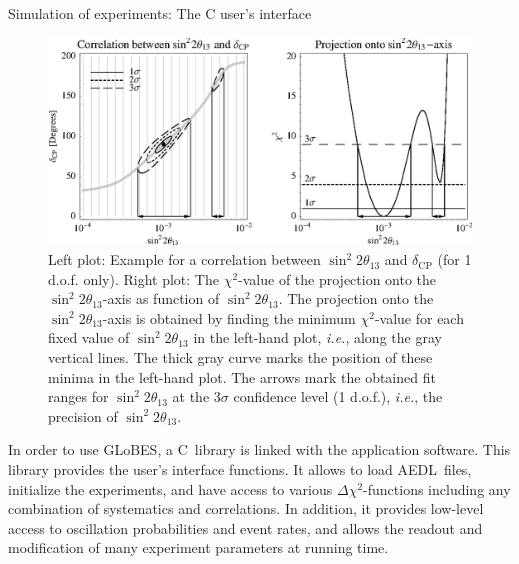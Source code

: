 \documentclass[12pt,a4paper]{article}
\makeatletter
\newcommand{\capdef}{}
\newcommand{\mycaption}[2][\capdef]{\renewcommand{\capdef}{#2}%
       \caption[#1]{{\footnotesize #2}}}
\renewcommand{\section}{\@startsection{section}{1}{0em}{-\baselineskip}%
{\baselineskip}{\normalfont\large\bfseries}}
\newcommand{\ie}{{\it i.e.}}
\newcommand{\deltacp}{\delta_{\mathrm{CP}}}
\newcommand{\stheta}{\sin^2 2 \theta_{13}}
\newcommand{\GLOBES}{{\sf GLoBES}}
\newcommand{\AEDL}{{\sf AEDL}}
\makeatother
\begin{document}
\section{Simulation of experiments: The C user's interface}

\begin{figure}[t]
\begin{center}
\includegraphics[width=16cm]{projex}
\end{center}
\mycaption{\label{fig:projex} Left plot: Example for a  correlation between $\stheta$ and $\deltacp$ (for 1 d.o.f. only). Right plot: The $\chi^2$-value of the projection onto the $\stheta$-axis as function of $\stheta$. The projection onto the  $\stheta$-axis is obtained by finding the minimum $\chi^2$-value for each fixed value of $\stheta$ in the left-hand plot, \ie, along the gray vertical lines. The thick gray curve marks the position of these minima in the left-hand plot. The arrows mark the obtained fit ranges for $\stheta$ at the $3 \sigma$ confidence level (1 d.o.f.), \ie , the precision of $\stheta$.}
\end{figure}

In order to use \GLOBES , a C~library is linked with the application
software. This library provides the user's interface functions.
It allows to load \AEDL\ files, initialize the experiments, and
have access to various $\Delta \chi^2$-functions including any combination
of systematics and correlations. In addition, it provides low-level
access to oscillation probabilities and event rates, and allows
the readout and modification of many experiment parameters at running time.
\end{document}
